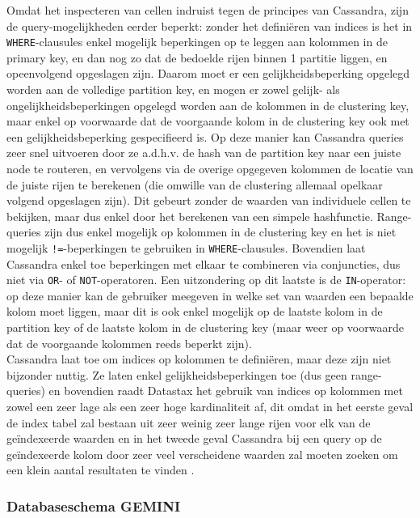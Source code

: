 Omdat het inspecteren van cellen indruist tegen de principes van Cassandra, zijn de query-mogelijkheden eerder beperkt: zonder het defini\"eren van indices is het in \texttt{WHERE}-clausules enkel mogelijk beperkingen op te leggen aan kolommen in de primary key, en dan nog zo dat de bedoelde rijen binnen 1 partitie liggen, en opeenvolgend opgeslagen zijn. Daarom moet er een gelijkheidsbeperking opgelegd worden aan de volledige partition key, en mogen er zowel gelijk- als ongelijkheidsbeperkingen opgelegd worden aan de kolommen in de clustering key, maar enkel op voorwaarde dat de voorgaande kolom in de clustering key ook met een gelijkheidsbeperking gespecifieerd is. Op deze manier kan Cassandra queries zeer snel uitvoeren door ze a.d.h.v. de hash van de partition key naar een juiste node te routeren, en vervolgens via de overige opgegeven kolommen de locatie van de juiste rijen te berekenen (die omwille van de clustering allemaal opelkaar volgend opgeslagen zijn). Dit gebeurt zonder de waarden van individuele cellen te bekijken, maar dus enkel door het berekenen van een simpele hashfunctie. Range-queries zijn dus enkel mogelijk op kolommen in de clustering key en het is niet mogelijk \texttt{!=}-beperkingen te gebruiken in \texttt{WHERE}-clausules. Bovendien laat Cassandra enkel toe beperkingen met elkaar te combineren via conjuncties, dus niet via \texttt{OR}- of \texttt{NOT}-operatoren. Een uitzondering op dit laatste is de \texttt{IN}-operator: op deze manier kan de gebruiker meegeven in welke set van waarden een bepaalde kolom moet liggen, maar dit is ook enkel mogelijk op de laatste kolom in de partition key of de laatste kolom in de clustering key (maar weer op voorwaarde dat de voorgaande kolommen reeds beperkt zijn).\\
Cassandra laat toe om indices op kolommen te defini\"eren, maar deze zijn niet bijzonder nuttig. Ze laten enkel gelijkheidsbeperkingen toe (dus geen range-queries) en bovendien raadt Datastax het gebruik van indices op kolommen met zowel een zeer lage als een zeer hoge kardinaliteit af, dit omdat in het eerste geval de index tabel zal bestaan uit zeer weinig zeer lange rijen voor elk van de ge\"indexeerde waarden en in het tweede geval Cassandra bij een query op de ge\"indexeerde kolom door zeer veel verscheidene waarden zal moeten zoeken om een klein aantal resultaten te vinden \cite{when_to_use_index}.

\subsubsection{Databaseschema GEMINI}

